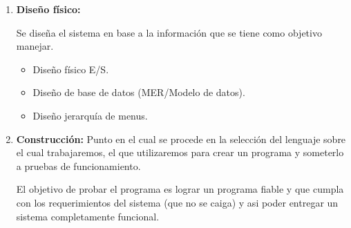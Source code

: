 \documentclass{templateNote}
\begin{document}
\begin{enumerate}
        \item \hypertarget{DFi}{\textbf{Diseño físico:}} Se diseña el sistema en base a la información que se tiene como objetivo manejar.
        \begin{itemize}
            \item Diseño físico E/S.
            \item Diseño de base de datos (MER/Modelo de datos).
            \item Diseño jerarquía de menus.
        \end{itemize}
    \item \label{item:ConsCas} \hypertarget{C}{\textbf{Construcción:}} Punto en el cual se procede en la selección del lenguaje sobre el cual trabajaremos, el que utilizaremos para crear un programa y someterlo a pruebas de funcionamiento.
    
    El objetivo de probar el programa es lograr un programa fiable y que cumpla con los requerimientos del sistema (que no se caiga) y asi poder entregar un sistema completamente funcional.
    

\end{enumerate}
\end{document}
